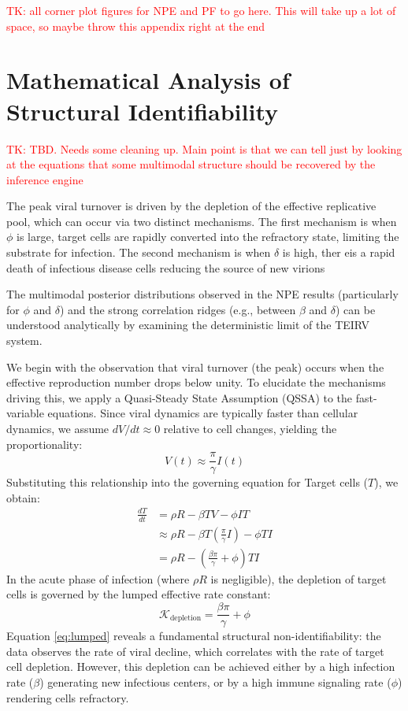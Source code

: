 \documentclass{article}
\begin{document}
\textcolor{red}{TK: all corner plot figures for NPE and PF to go here. This will take up a lot of space, so maybe throw this appendix right at the end}


\section{Mathematical Analysis of Structural Identifiability}\label{sec:teivr_identifiable}

\textcolor{red}{TK: TBD. Needs some cleaning up. Main point is that we can tell just by looking at the equations that some multimodal structure should be recovered by the inference engine}


The peak viral turnover is driven by the depletion of the effective replicative pool, which can occur via two distinct mechanisms. The first mechanism is when $\phi$ is large, target cells are rapidly converted into the refractory state, limiting the substrate for infection. The second mechanism is when $\delta$ is high, ther eis a rapid death of infectious disease cells reducing the source of new virions 


The multimodal posterior distributions observed in the NPE results (particularly for $\phi$ and $\delta$) and the strong correlation ridges (e.g., between $\beta$ and $\delta$) can be understood analytically by examining the deterministic limit of the TEIRV system.

We begin with the observation that viral turnover (the peak) occurs when the effective reproduction number drops below unity. To elucidate the mechanisms driving this, we apply a Quasi-Steady State Assumption (QSSA) to the fast-variable equations. Since viral dynamics are typically faster than cellular dynamics, we assume $dV/dt \approx 0$ relative to cell changes, yielding the proportionality:
\begin{equation}
    V(t) \approx \frac{\pi}{\gamma} I(t)
\end{equation}
Substituting this relationship into the governing equation for Target cells ($T$), we obtain:
\begin{align}
    \frac{dT}{dt} &= \rho R - \beta T V - \phi I T \\
    &\approx \rho R - \beta T \left( \frac{\pi}{\gamma} I \right) - \phi T I \\
    &= \rho R - \left( \frac{\beta \pi}{\gamma} + \phi \right) T I \label{eq:lumped}
\end{align}
In the acute phase of infection (where $\rho R$ is negligible), the depletion of target cells is governed by the lumped effective rate constant:
\begin{equation}
    \mathcal{K}_{\text{depletion}} = \frac{\beta \pi}{\gamma} + \phi
\end{equation}
Equation \ref{eq:lumped} reveals a fundamental structural non-identifiability: the data observes the rate of viral decline, which correlates with the rate of target cell depletion. However, this depletion can be achieved either by a high infection rate ($\beta$) generating new infectious centers, or by a high immune signaling rate ($\phi$) rendering cells refractory.
\end{document}
